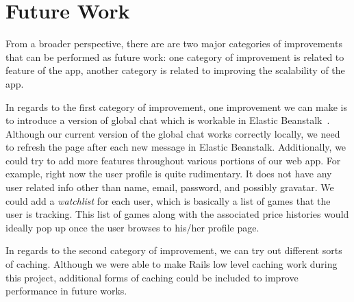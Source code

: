\chapter{Future Work}
From a broader perspective, there are are two major categories of improvements that can be performed as future work: one category of improvement is related to feature of the app, another category is related to improving the scalability of the app.

In regards to the first category of improvement, one improvement we can make is to introduce a version of global chat which is workable in Elastic Beanstalk~\cite{eb}. Although our current version of the global chat works correctly locally, we need to refresh the page after each new message in Elastic Beanstalk. Additionally, we could try to add more features throughout various portions of our web app. For example, right now the user profile is quite rudimentary. It does not have any user related info other than name, email, password, and possibly gravatar. We could add a \textit{watchlist} for each user, which is basically a list of games that the user is tracking. This list of games along with the associated price histories would ideally pop up once the user browses to his/her profile page.

In regards to the second category of improvement, we can try out different sorts of caching. Although we were able to make Rails low level caching work during this project, additional forms of caching could be included to improve performance in future works.